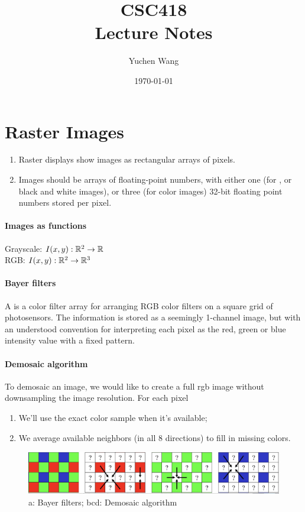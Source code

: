 \documentclass[11pt]{article}
\title{CSC418\\ Lecture Notes}
\author{Yuchen Wang}
\date{\today}
\numberwithin{equation}{section}
\begin{document}
    \maketitle
    \tableofcontents
    \newpage
\section{Raster Images}
\begin{enumerate}
	\item Raster displays show images as rectangular arrays of pixels.
	\item Images should be arrays of floating-point numbers, with either one (for , or black and white images), or three (for  color images) 32-bit floating point numbers stored per pixel.
\end{enumerate}

\paragraph{Images as functions}
Grayscale: $I(x, y): \mathbb{R}^2 \rightarrow \mathbb{R}$\\
RGB: $I(x, y): \mathbb{R}^2 \rightarrow \mathbb{R}^3$\\



\paragraph{Bayer filters}
A  is a color filter array for arranging RGB color filters on a square grid of photosensors. The information is stored as a seemingly 1-channel image, but with an understood convention for interpreting each pixel as the red, green or blue intensity value with a fixed pattern.
\paragraph{Demosaic algorithm}
To demosaic an image, we would like to create a full rgb image without downsampling the image resolution. For each pixel
\begin{enumerate}
	\item We'll use the exact color sample when it's available;
	\item We average available neighbors (in all 8 directions) to fill in missing colors.
\end{enumerate}

	\begin{figure}[H]
	\centering
	\includegraphics[scale=0.4]{p25}
	\caption{a: Bayer filters; bcd: Demosaic algorithm}
	\end{figure}
\end{document}
